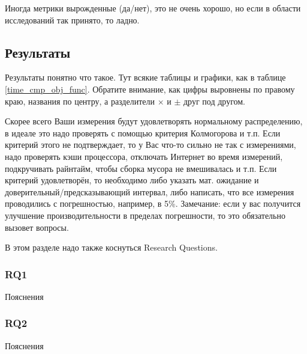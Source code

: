 Иногда метрики вырожденные (да/нет), это не очень хорошо, но если в области исследований так принято, то ладно.

\subsection{Результаты}
Результаты понятно что такое. Тут всякие таблицы и графики, как в таблице \ref{time_cmp_obj_func}. Обратите внимание, как цифры выровнены по правому краю, названия по центру, а разделители $\times$ и $\pm$ друг под другом.

Скорее всего Ваши измерения будут удовлетворять нормальному распределению, в идеале это надо проверять с помощью критерия Колмогорова и т.п. Если критерий этого не подтверждает, то у Вас что-то сильно не так с измерениями, надо проверять кэши процессора, отключать Интернет во время измерений, подкручивать райнтайм, чтобы сборка мусора не вмешивалась и т.п. Если критерий удовлетворён, то необходимо либо указать мат. ожидание и доверительный/предсказывающий интервал, либо написать, что все измерения проводились с погрешностью, например, в 5\%. Замечание: если у вас получится улучшение производительности в пределах погрешности, то это обязательно вызовет вопросы.

В этом разделе надо также коснуться Research Questions.

\subsubsection{RQ1} Пояснения
\subsubsection{RQ2} Пояснения

